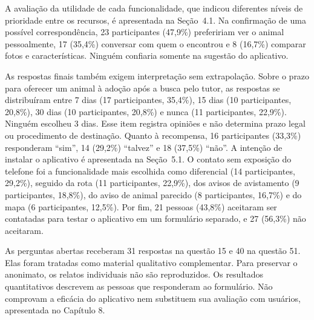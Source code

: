 A avaliação da utilidade de cada funcionalidade, que indicou diferentes níveis de prioridade entre os recursos, é apresentada na Seção~4.1. Na confirmação de uma possível correspondência, 23 participantes (47,9\%) prefeririam ver o animal pessoalmente, 17 (35,4\%) conversar com quem o encontrou e 8 (16,7\%) comparar fotos e características. Ninguém confiaria somente na sugestão do aplicativo.

\clearpage

As respostas finais também exigem interpretação sem extrapolação. Sobre o prazo para oferecer um animal à adoção após a busca pelo tutor, as respostas se distribuíram entre 7 dias (17 participantes, 35,4\%), 15 dias (10 participantes, 20,8\%), 30 dias (10 participantes, 20,8\%) e nunca (11 participantes, 22,9\%). Ninguém escolheu 3 dias. Esse item registra opiniões e não determina prazo legal ou procedimento de destinação. Quanto à recompensa, 16 participantes (33,3\%) responderam ``sim'', 14 (29,2\%) ``talvez'' e 18 (37,5\%) ``não''. A intenção de instalar o aplicativo é apresentada na Seção~5.1. O contato sem exposição do telefone foi a funcionalidade mais escolhida como diferencial (14 participantes, 29,2\%), seguido da rota (11 participantes, 22,9\%), dos avisos de avistamento (9 participantes, 18,8\%), do aviso de animal parecido (8 participantes, 16,7\%) e do mapa (6 participantes, 12,5\%). Por fim, 21 pessoas (43,8\%) aceitaram ser contatadas para testar o aplicativo em um formulário separado, e 27 (56,3\%) não aceitaram.

As perguntas abertas receberam 31 respostas na questão 15 e 40 na questão 51. Elas foram tratadas como material qualitativo complementar. Para preservar o anonimato, os relatos individuais não são reproduzidos. Os resultados quantitativos descrevem as pessoas que responderam ao formulário. Não comprovam a eficácia do aplicativo nem substituem sua avaliação com usuários, apresentada no Capítulo 8.
